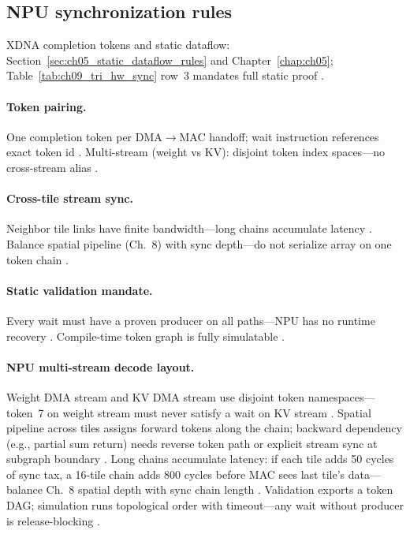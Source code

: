 \subsection{NPU synchronization rules}
XDNA completion tokens and static dataflow: Section~\ref{sec:ch05_static_dataflow_rules} and Chapter~\ref{chap:ch05}; Table~\ref{tab:ch09_tri_hw_sync} row~3 mandates full static proof \citep{amd2024xdna,amd2024aie,yirage2026}.

\paragraph{Token pairing.}
One completion token per DMA$\rightarrow$MAC handoff; wait instruction references exact token id \citep{amd2024aie,amd2024xdna}.
Multi-stream (weight vs KV): disjoint token index spaces---no cross-stream alias \citep{yirage2026,shah2024flashattention3,kwon2023vllm}.

\paragraph{Cross-tile stream sync.}
Neighbor tile links have finite bandwidth---long chains accumulate latency \citep{amd2024xdna,patel2025llminference,memoryfloor2026}.
Balance spatial pipeline (Ch.~8) with sync depth---do not serialize array on one token chain \citep{amd2024aie,chen2020compilerbasedhardw}.

\paragraph{Static validation mandate.}
Every wait must have a proven producer on all paths---NPU has no runtime recovery \citep{amd2024xdna,yirage2026,wu2024mirage}.
Compile-time token graph is fully simulatable \citep{amd2024aie,taxbreak2026}.

\paragraph{NPU multi-stream decode layout.}
Weight DMA stream and KV DMA stream use disjoint token namespaces---token~7 on weight stream must never satisfy a wait on KV stream \citep{amd2024xdna,amd2024aie,yirage2026}.
Spatial pipeline across tiles assigns forward tokens along the chain; backward dependency (e.g., partial sum return) needs reverse token path or explicit stream sync at subgraph boundary \citep{patel2025llminference,memoryfloor2026}.
Long chains accumulate latency: if each tile adds 50 cycles of sync tax, a 16-tile chain adds 800 cycles before MAC sees last tile's data---balance Ch.~8 spatial depth with sync chain length \citep{amd2024aie,chen2020compilerbasedhardw,shah2024flashattention3}.
Validation exports a token DAG; simulation runs topological order with timeout---any wait without producer is release-blocking \citep{yirage2026,wu2024mirage}.

